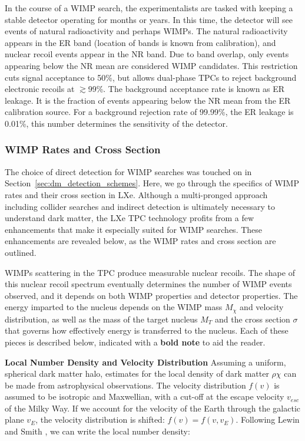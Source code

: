 In the course of a \ac{WIMP} search, the experimentalists are tasked with keeping a stable detector operating for months or years. In this time, the detector will see events of natural radioactivity and perhaps \ac{WIMP}s. The natural radioactivity appears in the \ac{ER} band (location of bands is known from calibration), and nuclear recoil events appear in the \ac{NR} band. Due to band overlap, only events appearing below the \ac{NR} mean are considered \ac{WIMP} candidates. This restriction cuts signal acceptance to 50\%, but allows dual-phase \ac{TPC}s to reject background electronic recoils at $\gtrsim$99\%. The background acceptance rate is known as \ac{ER} leakage. It is the fraction of events appearing below the \ac{NR} mean from the \ac{ER} calibration source. For a background rejection rate of 99.99\%, the \ac{ER} leakage is 0.01\%, this number determines the sensitivity of the detector.


\subsubsection{WIMP Rates and Cross Section}
\label{sec:wimp_rates}
The choice of direct detection for \ac{WIMP} searches was touched on in Section~\ref{sec:dm_detection_schemes}. Here, we go through the specifics of \ac{WIMP} rates and their cross section in \ac{LXe}. Although a multi-pronged approach including collider searches and indirect detection is ultimately necessary to understand dark matter, the \ac{LXe} \ac{TPC} technology profits from a few enhancements that make it especially suited for \ac{WIMP} searches. These enhancements are revealed below, as the \ac{WIMP} rates and cross section are outlined. 

\ac{WIMP}s scattering in the \ac{TPC} produce measurable nuclear recoils. The shape of this nuclear recoil spectrum eventually determines the number of \ac{WIMP} events observed, and it depends on both \ac{WIMP} properties and detector properties. The energy imparted to the nucleus depends on the \ac{WIMP} mass $M_{\chi}$ and velocity distribution, as well as the mass of the target nucleus $M_{T}$ and the cross section $\sigma$ that governs how effectively energy is transferred to the nucleus. Each of these pieces is described below, indicated with a \textbf{bold note} to aid the reader.

\textbf{Local Number Density and Velocity Distribution} Assuming a uniform, spherical dark matter halo, estimates for the local density of dark matter $\rho{\chi}$ can be made from astrophysical observations. The velocity distribution $f(v)$ is assumed to be isotropic and Maxwellian, with a cut-off at the escape velocity $v_{esc}$ of the Milky Way. If we account for the velocity of the Earth through the galactic plane $v_{E}$, the velocity distribution is shifted: $f(v) = f(v,v_{E})$. Following Lewin and Smith \cite{Lewin1996}, we can write the local number density:


